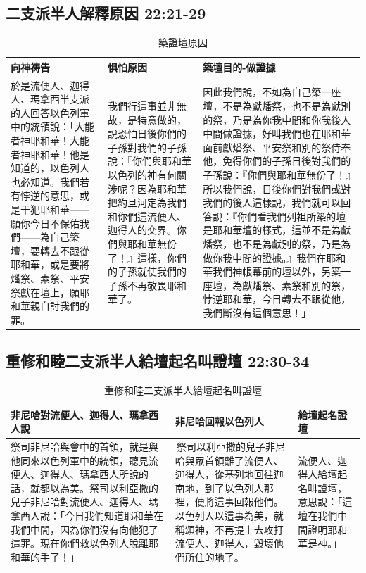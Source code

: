 \subsection{二支派半人解釋原因 22:21-29}
\begin{table}[H]
\centering
\begin{tabular}{p{4.75cm}|p{}|p{8.25cm}}\hline\hline
向神祷告&惧怕原因&築壇目的-做證據\\\hline
於是流便人、迦得人、瑪拿西半支派的人回答以色列軍中的統領說：「大能者神耶和華！大能者神耶和華！他是知道的，以色列人也必知道。我們若有悖逆的意思，或是干犯耶和華——願你今日不保佑我們——為自己築壇，要轉去不跟從耶和華，或是要將燔祭、素祭、平安祭獻在壇上，願耶和華親自討我們的罪。
&我們行這事並非無故，是特意做的，說恐怕日後你們的子孫對我們的子孫說：『你們與耶和華以色列的神有何關涉呢？因為耶和華把約旦河定為我們和你們這流便人、迦得人的交界。你們與耶和華無份了！』這樣，你們的子孫就使我們的子孫不再敬畏耶和華了。
&因此我們說，不如為自己築一座壇，不是為獻燔祭，也不是為獻別的祭，乃是為你我中間和你我後人中間做證據，好叫我們也在耶和華面前獻燔祭、平安祭和別的祭侍奉他，免得你們的子孫日後對我們的子孫說：『你們與耶和華無份了！』所以我們說，日後你們對我們或對我們的後人這樣說，我們就可以回答說：『你們看我們列祖所築的壇是耶和華壇的樣式，這並不是為獻燔祭，也不是為獻別的祭，乃是為做你我中間的證據。』我們在耶和華我們神帳幕前的壇以外，另築一座壇，為獻燔祭、素祭和別的祭，悖逆耶和華，今日轉去不跟從他，我們斷沒有這個意思！」\\\hline
 \end{tabular}
\caption{築證壇原因}
\end{table}

\subsection{重修和睦二支派半人給壇起名叫證壇 22:30-34}
\begin{table}[H]
\centering
\begin{tabular}{p{}|p{6.2cm}|p{2.5cm}}\hline\hline
非尼哈對流便人、迦得人、瑪拿西人說&非尼哈回報以色列人&給壇起名證壇\\\hline
祭司非尼哈與會中的首領，就是與他同來以色列軍中的統領，聽見流便人、迦得人、瑪拿西人所說的話，就都以為美。祭司以利亞撒的兒子非尼哈對流便人、迦得人、瑪拿西人說：「今日我們知道耶和華在我們中間，因為你們沒有向他犯了這罪。現在你們救以色列人脫離耶和華的手了！」&
 祭司以利亞撒的兒子非尼哈與眾首領離了流便人、迦得人，從基列地回往迦南地，到了以色列人那裡，便將這事回報他們。以色列人以這事為美，就稱頌神，不再提上去攻打流便人、迦得人，毀壞他們所住的地了。
&流便人、迦得人給壇起名叫證壇，意思說：「這壇在我們中間證明耶和華是神。」\\\hline
 \end{tabular}
\caption{重修和睦二支派半人給壇起名叫證壇}
\end{table}




